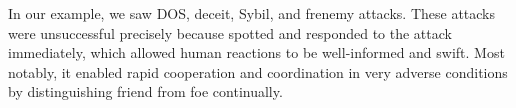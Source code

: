 In our example, we saw DOS, deceit, Sybil, and frenemy attacks.
These attacks were unsuccessful precisely because \projectName spotted and responded to the attack immediately, which allowed human reactions to be well-informed and swift.
Most notably, it enabled rapid cooperation and coordination in very adverse conditions by distinguishing friend from foe continually.
